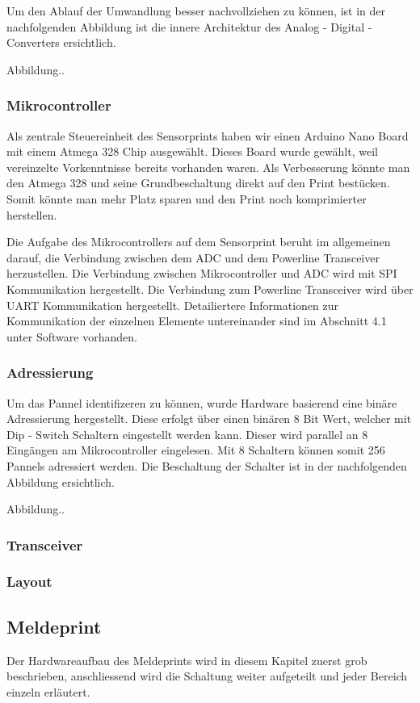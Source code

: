Um den Ablauf der Umwandlung besser nachvollziehen zu können, ist in der nachfolgenden Abbildung ist die innere Architektur des Analog - Digital - Converters ersichtlich.

Abbildung..

\subsubsection{Mikrocontroller}
Als zentrale Steuereinheit des Sensorprints haben wir einen Arduino Nano Board mit einem Atmega 328 Chip ausgewählt. Dieses Board wurde gewählt, weil vereinzelte Vorkenntnisse bereits vorhanden waren. Als Verbesserung könnte man den Atmega 328 und seine Grundbeschaltung direkt auf den Print bestücken. Somit könnte man mehr Platz sparen und den Print noch komprimierter herstellen.

Die Aufgabe des Mikrocontrollers auf dem Sensorprint beruht im allgemeinen darauf, die Verbindung zwischen dem ADC und dem Powerline Transceiver herzustellen. Die Verbindung zwischen Mikrocontroller und ADC wird mit SPI Kommunikation hergestellt. Die Verbindung zum Powerline Transceiver wird über UART Kommunikation hergestellt. Detailiertere Informationen zur Kommunikation der einzelnen Elemente untereinander sind im Abschnitt 4.1 unter Software vorhanden.

\subsubsection{Adressierung}
Um das Pannel identifizeren zu können, wurde Hardware basierend eine binäre Adressierung hergestellt. Diese erfolgt über einen binären 8 Bit Wert, welcher mit Dip - Switch Schaltern eingestellt werden kann. Dieser wird parallel an 8 Eingängen am Mikrocontroller eingelesen. Mit 8 Schaltern können somit 256 Pannels adressiert werden. Die Beschaltung der Schalter ist in der nachfolgenden Abbildung ersichtlich.

Abbildung..

\subsubsection{Transceiver}
\subsubsection{Layout}

\subsection{Meldeprint}
Der Hardwareaufbau des Meldeprints wird in diesem Kapitel zuerst grob beschrieben, anschliessend wird die Schaltung weiter aufgeteilt und jeder Bereich einzeln erläutert.
